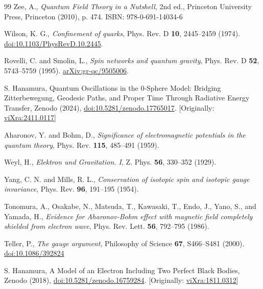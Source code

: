 \documentclass[%
 reprint,
 amsmath,amssymb,
 aps,
]{revtex4-1}
\numberwithin{equation}{section}%
\begin{document}
\newpage



%
%

\begin{thebibliography}{99}
 Zee, A., 
\textit{Quantum Field Theory in a Nutshell}, 
2nd ed., Princeton University Press, Princeton (2010), p. 474. 
ISBN: 978-0-691-14034-6

 Wilson, K. G., 
\textit{Confinement of quarks}, 
Phys. Rev. D \textbf{10}, 2445--2459 (1974). 
\href{https://link.aps.org/doi/10.1103/PhysRevD.10.2445}{doi:10.1103/PhysRevD.10.2445}.

 Rovelli, C. and Smolin, L., 
\textit{Spin networks and quantum gravity}, 
Phys. Rev. D \textbf{52}, 5743--5759 (1995). 
\href{https://arxiv.org/abs/gr-qc/9505006}{arXiv:gr-qc/9505006}.

S. Hanamura, Quantum Oscillations in the 0-Sphere Model: Bridging Zitterbewegung, Geodesic Paths, and Proper Time Through Radiative Energy Transfer, Zenodo (2024), \href{https://doi.org/10.5281/zenodo.17765017}{doi:10.5281/zenodo.17765017}. [Originally: \href{https://vixra.org/abs/2411.0117}{viXra:2411.0117}]

 Aharonov, Y. and Bohm, D.,
\textit{Significance of electromagnetic potentials in the quantum theory},
Phys. Rev. \textbf{115}, 485--491 (1959).

 Weyl, H.,
\textit{Elektron und Gravitation. I},
Z. Phys. \textbf{56}, 330--352 (1929).

 Yang, C. N. and Mills, R. L.,
\textit{Conservation of isotopic spin and isotopic gauge invariance},
Phys. Rev. \textbf{96}, 191--195 (1954).

 Tonomura, A., Osakabe, N., Matsuda, T., Kawasaki, T., Endo, J., Yano, S., and Yamada, H.,
\textit{Evidence for Aharonov-Bohm effect with magnetic field completely shielded from electron wave},
Phys. Rev. Lett. \textbf{56}, 792--795 (1986).

 Teller, P.,
\textit{The gauge argument},
Philosophy of Science \textbf{67}, S466--S481 (2000).
\href{https://doi.org/10.1086/392824}{doi:10.1086/392824}

S. Hanamura, A Model of an Electron Including Two Perfect Black Bodies, Zenodo (2018), \href{https://doi.org/10.5281/zenodo.16759284}{doi:10.5281/zenodo.16759284}. [Originally: \href{https://vixra.org/abs/1811.0312}{viXra:1811.0312}]


\end{thebibliography}
\end{document}
